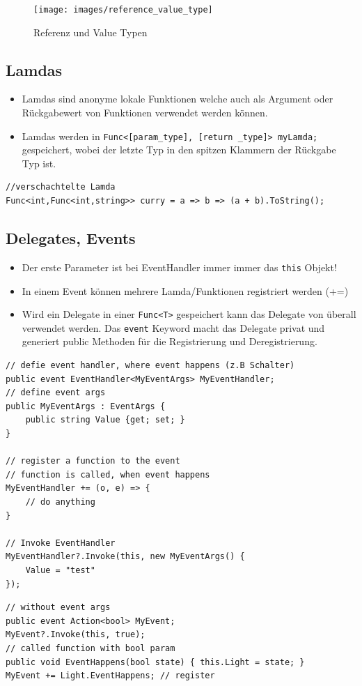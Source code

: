 \begin{figure}[h!]
\centering
\texttt{[image: images/reference\_value\_type]}
\caption{Referenz und Value Typen}
\label{fig:valuetypes}
\end{figure}

\clearpage

\subsection{Lamdas}
\begin{itemize}
	\item Lamdas sind anonyme lokale Funktionen welche auch als Argument oder Rückgabewert von Funktionen verwendet werden können.
	\item Lamdas werden in \lstinline|Func<[param_type], [return _type]> myLamda;| gespeichert, wobei der letzte Typ in den spitzen Klammern der Rückgabe Typ ist.
\end{itemize}

\begin{lstlisting}
//verschachtelte Lamda
Func<int,Func<int,string>> curry = a => b => (a + b).ToString();
\end{lstlisting}

\subsection{Delegates, Events} \label{sub:DelgateEventSummary}
\begin{itemize}
	\item Der erste Parameter ist bei EventHandler immer immer das \lstinline|this| Objekt!
	\item In einem Event können mehrere Lamda/Funktionen registriert werden (+=)
	\item Wird ein Delegate in einer \lstinline|Func<T>| gespeichert kann das Delegate von überall verwendet werden. Das \lstinline|event| Keyword macht das Delegate privat und generiert public Methoden für die Registrierung und Deregistrierung.
\end{itemize}

\begin{lstlisting}
// defie event handler, where event happens (z.B Schalter)
public event EventHandler<MyEventArgs> MyEventHandler;
// define event args
public MyEventArgs : EventArgs {
	public string Value {get; set; }
}

// register a function to the event
// function is called, when event happens
MyEventHandler += (o, e) => {
	// do anything
}

// Invoke EventHandler
MyEventHandler?.Invoke(this, new MyEventArgs() {
	Value = "test"
});
\end{lstlisting}
\begin{lstlisting}
// without event args
public event Action<bool> MyEvent;
MyEvent?.Invoke(this, true);
// called function with bool param
public void EventHappens(bool state) { this.Light = state; }
MyEvent += Light.EventHappens; // register
\end{lstlisting}

